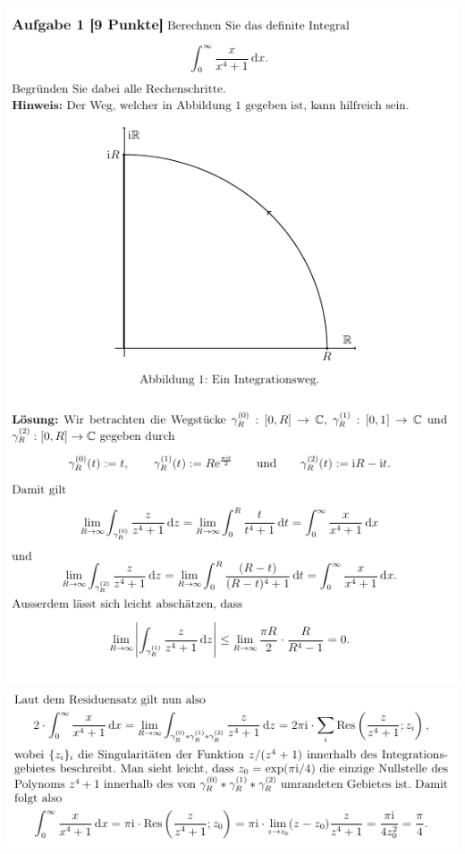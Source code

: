 \includegraphics[width=1\textwidth]{images/img_koma/example_1.5.1_fs18.png}
\includegraphics[width=1\textwidth]{images/img_koma/example_1.5.2_fs18.png}


